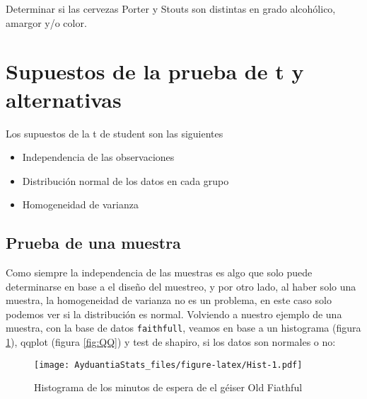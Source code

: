 \documentclass[]{book}
\newenvironment{Shaded}{\begin{snugshade}}{\end{snugshade}}
\newcommand{\DataTypeTok}[1]{\textcolor[rgb]{0.13,0.29,0.53}{#1}}
\newcommand{\KeywordTok}[1]{\textcolor[rgb]{0.13,0.29,0.53}{\textbf{#1}}}
\newcommand{\NormalTok}[1]{#1}
\newcommand{\OperatorTok}[1]{\textcolor[rgb]{0.81,0.36,0.00}{\textbf{#1}}}
\newcommand{\StringTok}[1]{\textcolor[rgb]{0.31,0.60,0.02}{#1}}
\providecommand{\tightlist}{%
  \setlength{\itemsep}{0pt}\setlength{\parskip}{0pt}}
\begin{document}
Determinar si las cervezas Porter y Stouts son distintas en grado alcohólico, amargor y/o color.

\hypertarget{supuestos-de-la-prueba-de-t-y-alternativas}{%
\section{Supuestos de la prueba de t y alternativas}\label{supuestos-de-la-prueba-de-t-y-alternativas}}

Los supuestos de la t de student son las siguientes \citep{boneau1960effects}

\begin{itemize}
\tightlist
\item
  Independencia de las observaciones
\item
  Distribución normal de los datos en cada grupo
\item
  Homogeneidad de varianza
\end{itemize}

\hypertarget{prueba-de-una-muestra}{%
\subsection{Prueba de una muestra}\label{prueba-de-una-muestra}}

Como siempre la independencia de las muestras es algo que solo puede determinarse en base a el diseño del muestreo, y por otro lado, al haber solo una muestra, la homogeneidad de varianza no es un problema, en este caso solo podemos ver si la distribución es normal. Volviendo a nuestro ejemplo de una muestra, con la base de datos \texttt{faithfull}, veamos en base a un histograma (figura \ref{fig:Hist}), qqplot (figura \ref{fig:QQ}) y test de shapiro, si los datos son normales o no:

\begin{Shaded}
\end{Shaded}

\begin{figure}
\centering
\texttt{[image: AyduantiaStats\_files/figure-latex/Hist-1.pdf]}
\caption{\label{fig:Hist}Histograma de los minutos de espera de el géiser Old Fiathful}
\end{figure}
\end{document}
